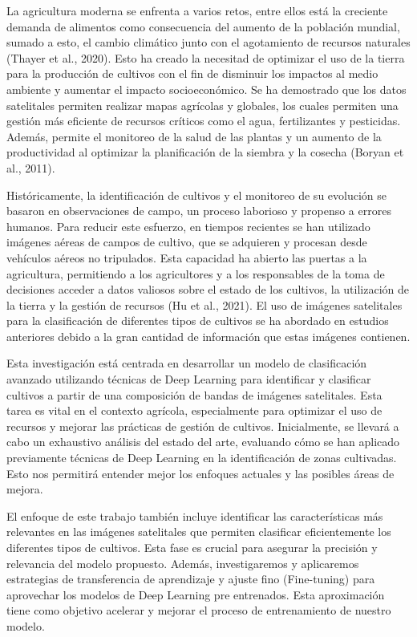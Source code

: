 La agricultura moderna se enfrenta a varios retos, entre ellos está la creciente demanda 
de alimentos como consecuencia del aumento de la población mundial, sumado a esto, el
cambio climático junto con el agotamiento de recursos naturales (Thayer et al., 2020). Esto
ha creado la necesitad de optimizar el uso de la tierra para la producción de cultivos con
el fin de disminuir los impactos al medio ambiente y aumentar el impacto socioeconómico.
Se ha demostrado que los datos satelitales permiten realizar mapas agrícolas y globales,
los cuales permiten una gestión más eficiente de recursos críticos como el agua,
fertilizantes y pesticidas. Además, permite el monitoreo de la salud de las plantas y un
aumento de la productividad al optimizar la planificación de la siembra y la cosecha (Boryan
et al., 2011).

Históricamente, la identificación de cultivos y el monitoreo de su evolución se basaron en
observaciones de campo, un proceso laborioso y propenso a errores humanos. Para
reducir este esfuerzo, en tiempos recientes se han utilizado imágenes aéreas de campos
de cultivo, que se adquieren y procesan desde vehículos aéreos no tripulados. Esta
capacidad ha abierto las puertas a la agricultura, permitiendo a los agricultores y a los
responsables de la toma de decisiones acceder a datos valiosos sobre el estado de los
cultivos, la utilización de la tierra y la gestión de recursos (Hu et al., 2021). El uso de
imágenes satelitales para la clasificación de diferentes tipos de cultivos se ha abordado en
estudios anteriores debido a la gran cantidad de información que estas imágenes
contienen.

Esta investigación está centrada en desarrollar un modelo de clasificación avanzado
utilizando técnicas de Deep Learning para identificar y clasificar cultivos a partir de una
composición de bandas de imágenes satelitales. Esta tarea es vital en el contexto agrícola,
especialmente para optimizar el uso de recursos y mejorar las prácticas de gestión de
cultivos. Inicialmente, se llevará a cabo un exhaustivo análisis del estado del arte,
evaluando cómo se han aplicado previamente técnicas de Deep Learning en la
identificación de zonas cultivadas. Esto nos permitirá entender mejor los enfoques actuales
y las posibles áreas de mejora.

El enfoque de este trabajo también incluye identificar las características más relevantes en
las imágenes satelitales que permiten clasificar eficientemente los diferentes tipos de
cultivos. Esta fase es crucial para asegurar la precisión y relevancia del modelo propuesto.
Además, investigaremos y aplicaremos estrategias de transferencia de aprendizaje y
ajuste fino (Fine-tuning) para aprovechar los modelos de Deep Learning pre entrenados.
Esta aproximación tiene como objetivo acelerar y mejorar el proceso de entrenamiento de
nuestro modelo.

